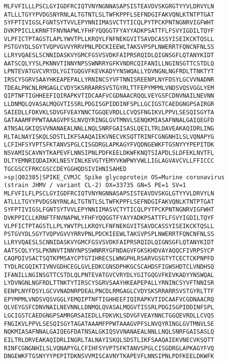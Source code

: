 \documentclass[en,black,12pt,normal]{elegantnote}
\begin{document}
\begin{lstlisting}
MLFVFILLLPSCLGYIGDFRCIQTVNYNGNNASAPSISTEAVDVSKGRGTYYVLDRVYLN
ATLLLTGYYPVDGSNYRNLALTGTNTLSLTWFKPPFLSEFNDGIFAKVQNLKTNTPTGAT
SYFPTIVIGSLFGNTSYTVVLEPYNNIIMASVCTYTICQLPYTPCKPNTNGNRVIGFWHT
DVKPPICLLKRNFTFNVNAPWLYFHFYQQGGTFYAYYADKPSATTFLFSVYIGDILTQYF
VLPFICTPTAGSTLAPLYWVTPLLKRQYLFNFNEKGVITSAVDCASSYISEIKCKTQSLL
PSTGVYDLSGYTVQPVGVVYRRVPNLPDCKIEEWLTAKSVPSPLNWERRTFQNCNFNLSS
LLRYVQAESLSCNNIDASKVYGMCFGSVSVDKFAIPRSRQIDLQIGNSGFLQTANYKIDT
AATSCQLYYSLPKNNVTINNYNPSSWNRRYGFKVNDRCQIFANILLNGINSGTTCSTDLQ
LPNTEVATGVCVRYDLYGITGQGVFKEVKADYYNSWQALLYDVNGNLNGFRDLTTNKTYT
IRSCYSGRVSAAYHKEAPEPALLYRNINCSYVFTNNISREENPLNYFDSYLGCVVNADNR
TDEALPNCNLRMGAGLCVDYSKSRRARRSVSTGYRLTTFEPYMPMLVNDSVQSVGGLYEM
QIPTNFTIGHHEEFIQIRAPKVTIDCAAFVCGDNAACRQQLVEYGSFCDNVNAILNEVNN
LLDNMQLQVASALMQGVTISSRLPDGISGPIDDINFSPLLGCIGSTCAEDGNGPSAIRGR
SAIEDLLFDKVKLSDVGFVEAYNNCTGGQEVRDLLCVQSFNGIKVLPPVLSESQISGYTA
GATAAAMFPPWTAAAGVPFSLNVQYRINGLGVTMNVLSENQKMIASAFNNALGAIQEGFD
ATNSALGKIQSVVNANAEALNNLLNQLSNRFGAISASLQEILTRLDAVEAKAQIDRLING
RLTALNAYISKQLSDSTLIKFSAAQAIEKVNECVKSQTTRINFCGNGNHILSLVQNAPYG
LCFIHFSYVPTSFKTANVSPGLCISGDRGLAPKAGYFVQDNGEWKFTGSNYYYPEPITDK
NSVAMISCAVNYTKAPEVFLNNSIPNLPDFKEELDKWFKNQTSIAPDLSLDFEKLNVTFL
DLTYEMNRIQDAIKKLNESYINLKEVGTYEMYVKWPWYVWLLIGLAGVAVCVLLFFICCC
TGCGSCCFRKCGSCCDEYGGHQDSIVIHNISAHED
>sp|Q02385|SPIKE_CVMJC Spike glycoprotein OS=Murine coronavirus (strain JHMV / variant CL-2) OX=33735 GN=S PE=1 SV=1
MLFVFILFLPSCLGYIGDFRCIQTVNYNGNNASAPSISTEAVDVSKGLGTYYVLDRVYLN
ATLLLTGYYPVDGSNYRNLALTGTNTLSLTWFKPPFLSEFNDGIFAKVQNLKTNTPTGAT
SYFPTIVIGSLFGNTSYTVVLEPYNNIIMASVCTYTICQLPYTPCKPNTNGNRVIGFWHT
DVKPPICLLKRNFTFNVNAPWLYFHFYQQGGTFYAYYADKPSATTFLFSVYIGDILTQYF
VLPFICTPTAGSTLLPLYWVTPLLKRQYLFNFNEKGVITSAVDCASSYISEIKCKTQSLL
PSTGVYDLSGYTVQPVGVVYRRVPNLPDCKIEEWLTAKSVPSPLNWERRTFQNCNFNLSS
LLRYVQAESLSCNNIDASKVYGMCFGSVSVDKFAIPRSRQIDLQIGNSGFLQTANYKIDT
AATSCQLYYSLPKNNVTINNYNPSSWNRRYGFNDAGVFGKSKHDVAYAQQCFIVRPSYCP
CAQPDIVSACTSQTKPMSAYCPTGTIHRECSLWNGPHLRSARVGSGTYTCECTCKPNPFD
TYDLRCGQIKTIVNVGDHCEGLGVLEDKCGNSDPHKGCSCAHDSFIGWSHDTCLVNDHSQ
IFANILLNGINSGTTCSTDLQLPNTEVATGVCVRYDLYGITGQGVFKEVKADYYNSWQAL
LYDVNGNLNGFRDLTTNKTYTIRSCYSGRVSAAYHKEAPEPALLYRNINCSYVFTNNISR
EENPLNYFDSYLGCVVNADNRPDEALPNCDLRMGAGLCVDYSKSRRARRSVSTGYRLTTF
EPYMPMLVNDSVQSVGGLYEMQIPTNFTIGHHEEFIQIRAPKVTIDCAAFVCGDNAACRQ
QLVEYGSFCDNVNAILNEVNNLLDNMQLQVASALMQGVTISSRLPDGISGPIDDINFSPL
LGCIGSTCAEDGNGPSAMRGRSAIEDLLFDKVKLSDVGFVEAYNNCTGGQEVRDLLCVQS
FNGIKVLPPVLSESQISGYTAGATAAAMFPPWTAAAGVPFSLNVQYRINGLGVTMNVLSE
NQKMIASAFNNALGAIQEGFDATNSALGKIQSVVNANAEALNNLLNQLSNRFGAISASLQ
EILTRLDRVEAKAQIDRLINGRLTALNAYISKQLSDSTLIKFSAAQAIEKVNECVKSQTT
RINFCGNGNHILSLVQNAPYGLCFIHFSYVPTSFKTANVSPGLCISGDRGLAPKAGYFVQ
DNGEWKFTGSNYYYPEPITDKNSVVMISCAVNYTKAPEVFLNNSIPNLPDFKEELDKWFK

\end{lstlisting}
\end{document}
